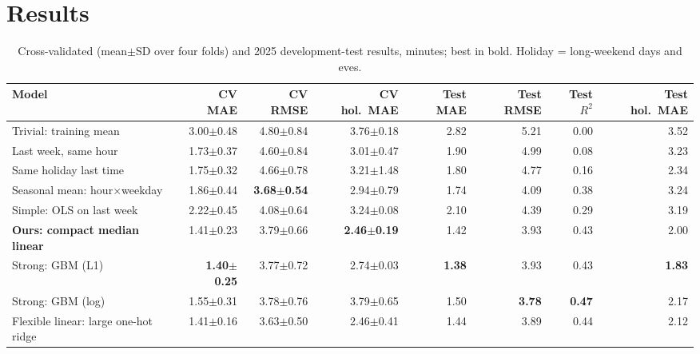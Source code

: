 \documentclass[11pt]{article}
\newcommand{\tb}{\footnotesize}
\begin{document}
\section{Results}
\begin{table}[t]\tb\centering\setlength{\tabcolsep}{3.5pt}
\begin{tabular}{@{}lrrrrrrr@{}}
\toprule Model & CV MAE & CV RMSE & CV hol.\ MAE & Test MAE & Test RMSE & Test $R^2$ & Test hol.\ MAE\\\midrule
Trivial: training mean & 3.00$\pm$0.48 & 4.80$\pm$0.84 & 3.76$\pm$0.18 & 2.82 & 5.21 & 0.00 & 3.52\\
Last week, same hour & 1.73$\pm$0.37 & 4.60$\pm$0.84 & 3.01$\pm$0.47 & 1.90 & 4.99 & 0.08 & 3.23\\
Same holiday last time & 1.75$\pm$0.32 & 4.66$\pm$0.78 & 3.21$\pm$1.48 & 1.80 & 4.77 & 0.16 & 2.34\\
Seasonal mean: hour$\times$weekday & 1.86$\pm$0.44 & \textbf{3.68$\pm$0.54} & 2.94$\pm$0.79 & 1.74 & 4.09 & 0.38 & 3.24\\
Simple: OLS on last week & 2.22$\pm$0.45 & 4.08$\pm$0.64 & 3.24$\pm$0.08 & 2.10 & 4.39 & 0.29 & 3.19\\
\textbf{Ours: compact median linear} & 1.41$\pm$0.23 & 3.79$\pm$0.66 & \textbf{2.46$\pm$0.19} & 1.42 & 3.93 & 0.43 & 2.00\\
Strong: GBM (L1) & \textbf{1.40$\pm$0.25} & 3.77$\pm$0.72 & 2.74$\pm$0.03 & \textbf{1.38} & 3.93 & 0.43 & \textbf{1.83}\\
Strong: GBM (log) & 1.55$\pm$0.31 & 3.78$\pm$0.76 & 3.79$\pm$0.65 & 1.50 & \textbf{3.78} & \textbf{0.47} & 2.17\\
Flexible linear: large one-hot ridge & 1.41$\pm$0.16 & 3.63$\pm$0.50 & 2.46$\pm$0.41 & 1.44 & 3.89 & 0.44 & 2.12\\\bottomrule
\end{tabular}
\caption{Cross-validated (mean$\pm$SD over four folds) and 2025 development-test results, minutes; best in bold. Holiday = long-weekend days and eves.}\label{tab:main}
\end{table}
\end{document}
